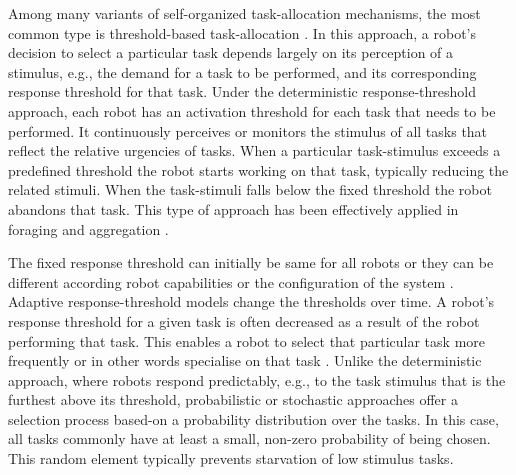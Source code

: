 \documentclass[smallcondensed]{svjour3}
\begin{document}
Among many variants of self-organized task-allocation mechanisms, the most common type is threshold-based task-allocation \citep{Bonabeau+1999}. In this approach, a robot's decision to select a particular task depends largely on its perception of a stimulus, e.g., the demand for a task to be performed, and its corresponding response threshold for that task. Under the deterministic response-threshold approach, each robot has an activation threshold for each task that needs to be performed. It continuously perceives or monitors the stimulus of all tasks that reflect the relative urgencies of tasks. When a particular task-stimulus exceeds a predefined threshold the robot starts working on that task, typically reducing the related stimuli. When the task-stimuli falls below the fixed threshold the robot abandons that task. This type of approach has been effectively applied in foraging \citep{Liu+2007,Krieger+2000} and aggregation \citep{Agassounon+2002}. 

The fixed response threshold can initially be same for all robots \citep{Jones+2000} or they can be different according robot capabilities or the configuration of the system \citep{Krieger+2000}. Adaptive response-threshold models change the thresholds over time. A robot's response threshold for a given task is often decreased as a result of the robot performing that task. This enables a robot to select that particular task more frequently or in other words specialise on that task \citep{Bonabeau+1999,Agassounon+2002}. Unlike the deterministic approach, where robots respond predictably, e.g., to the task stimulus that is the furthest above its threshold, probabilistic or stochastic approaches offer a selection process based-on a probability distribution over the tasks. In this case, all tasks commonly have at least a small, non-zero probability of being chosen. This random element typically prevents starvation of low stimulus tasks. 
\end{document}
